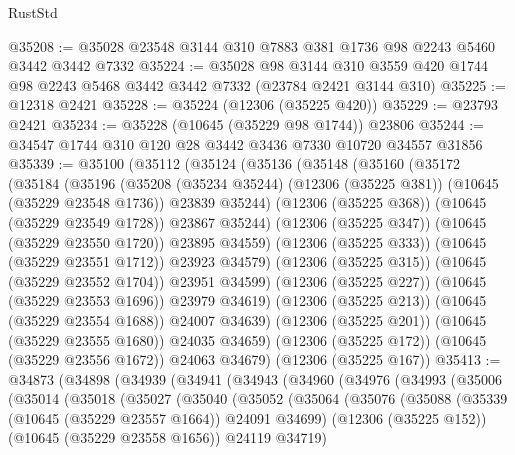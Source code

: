 \begin{lexlean}{RustStd}
\begin{coremodule}
@35208 := @35028 @23548 @3144 @310 @7883 @381 @1736 @98 @2243 @5460 @3442 @3442 @7332
@35224 := @35028
    @98
    @3144
    @310
    @3559
    @420
    @1744
    @98
    @2243
    @5468
    @3442
    @3442
    @7332
    (@23784 @2421 @3144 @310)
@35225 := @12318 @2421
@35228 := @35224 (@12306 (@35225 @420))
@35229 := @23793 @2421
@35234 := @35228 (@10645 (@35229 @98 @1744)) @23806
@35244 := @34547 @1744 @310 @120 @28 @3442 @3436 @7330 @10720 @34557 @31856
@35339 := @35100
    (@35112
      (@35124
        (@35136
          (@35148
            (@35160
              (@35172
                (@35184
                  (@35196
                    (@35208
                      (@35234 @35244)
                      (@12306 (@35225 @381))
                      (@10645 (@35229 @23548 @1736))
                      @23839
                      @35244)
                    (@12306 (@35225 @368))
                    (@10645 (@35229 @23549 @1728))
                    @23867
                    @35244)
                  (@12306 (@35225 @347))
                  (@10645 (@35229 @23550 @1720))
                  @23895
                  @34559)
                (@12306 (@35225 @333))
                (@10645 (@35229 @23551 @1712))
                @23923
                @34579)
              (@12306 (@35225 @315))
              (@10645 (@35229 @23552 @1704))
              @23951
              @34599)
            (@12306 (@35225 @227))
            (@10645 (@35229 @23553 @1696))
            @23979
            @34619)
          (@12306 (@35225 @213))
          (@10645 (@35229 @23554 @1688))
          @24007
          @34639)
        (@12306 (@35225 @201))
        (@10645 (@35229 @23555 @1680))
        @24035
        @34659)
      (@12306 (@35225 @172))
      (@10645 (@35229 @23556 @1672))
      @24063
      @34679)
    (@12306 (@35225 @167))
@35413 := @34873
    (@34898
      (@34939
        (@34941
          (@34943
            (@34960
              (@34976
                (@34993
                  (@35006
                    (@35014
                      (@35018
                        (@35027
                          (@35040
                            (@35052
                              (@35064
                                (@35076
                                  (@35088
                                    (@35339 (@10645 (@35229 @23557 @1664)) @24091 @34699)
                                    (@12306 (@35225 @152))
                                    (@10645 (@35229 @23558 @1656))
                                    @24119
                                    @34719)

\end{coremodule}
\end{lexlean}
